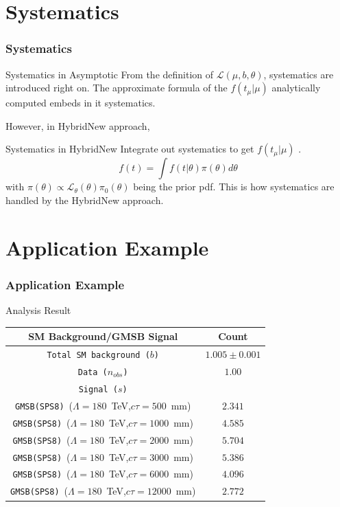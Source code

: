 \documentclass[12pt]{beamer}
\begin{document}
\section{Systematics}
\begin{frame}
\frametitle{Systematics}
\begin{varblock}[7cm]{Systematics in Asymptotic}
From the definition of $\mathcal{L}(\mu,b,\theta)$, systematics are introduced right on.
The approximate formula of the $f(t_{\mu}|\mu)$ analytically computed embeds in it systematics.
\end{varblock}
However, in HybridNew approach,
\begin{varblock}[7cm]{Systematics in HybridNew}
Integrate out systematics to get $f(t_{\mu}|\mu)$ .
\begin{equation*}
f(t) = \int f(t|\theta)\pi(\theta)d\theta
\end{equation*}
with $\pi(\theta) \propto \mathcal{L}_{\theta}(\theta)\pi_{0}(\theta)$ being the prior pdf.
\alert{This is how systematics are handled by the HybridNew approach}.
\end{varblock}
\end{frame}


\section{Application Example}
\begin{frame}
\frametitle{Application Example}
 \begin{varblock}[7.6cm]{Analysis Result}
  \begin{tabular}{c c}
   \hline
   \bfseries{SM Background/GMSB Signal} & \bfseries {Count}\\
   \hline \hline
   \texttt{Total SM background ($b$)} & $1.005 \pm 0.001$ \\
   \hline \hline
   \texttt{Data ($n_{obs}$)} & $1.00$ \\
   \hline \hline
   \texttt{Signal~($s$)}  &            \\
   \hline 
   \texttt{GMSB(SPS8)}~($\Lambda=180$~TeV,$c\tau=500$~mm) & $2.341$ \\
   \texttt{GMSB(SPS8)}~($\Lambda=180$~TeV,$c\tau=1000$~mm) & $4.585$ \\
   \texttt{GMSB(SPS8)}~($\Lambda=180$~TeV,$c\tau=2000$~mm) & $5.704$ \\
   \texttt{GMSB(SPS8)}~($\Lambda=180$~TeV,$c\tau=3000$~mm) & $5.386$ \\
   \texttt{GMSB(SPS8)}~($\Lambda=180$~TeV,$c\tau=6000$~mm) & $4.096$ \\ 
   \texttt{GMSB(SPS8)}~($\Lambda=180$~TeV,$c\tau=12000$~mm) & $2.772$ \\
   \hline
   \end{tabular}
 \end{varblock}
\end{frame}
\end{document}
